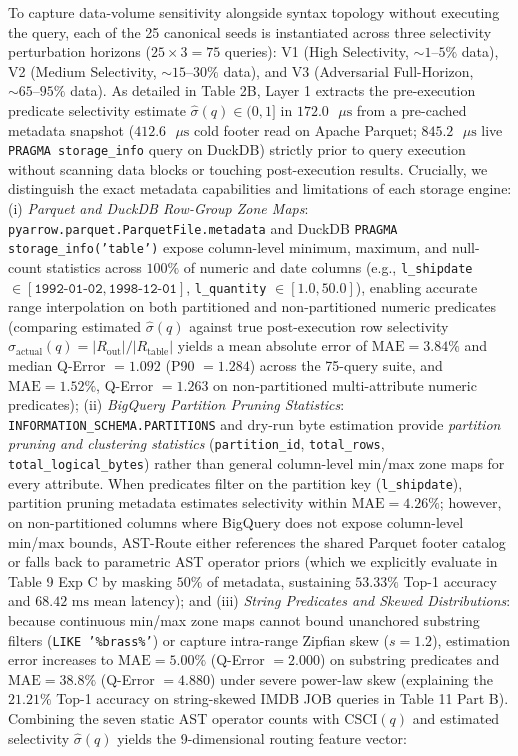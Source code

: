 \documentclass[10pt,a4paper]{article}
\begin{document}
To capture data-volume sensitivity alongside syntax topology without executing the query, each of the 25 canonical seeds is instantiated across three selectivity perturbation horizons ($25 \times 3 = 75$ queries): V1 (High Selectivity, $\sim 1\text{--}5\%$ data), V2 (Medium Selectivity, $\sim 15\text{--}30\%$ data), and V3 (Adversarial Full-Horizon, $\sim 65\text{--}95\%$ data). As detailed in Table 2B, Layer 1 extracts the pre-execution predicate selectivity estimate $\hat{\sigma}(q) \in (0, 1]$ in $172.0\text{ }\mu\text{s}$ from a pre-cached metadata snapshot ($412.6\text{ }\mu\text{s}$ cold footer read on Apache Parquet; $845.2\text{ }\mu\text{s}$ live \texttt{PRAGMA storage\_info} query on DuckDB) strictly prior to query execution without scanning data blocks or touching post-execution results. Crucially, we distinguish the exact metadata capabilities and limitations of each storage engine: (i) \emph{Parquet and DuckDB Row-Group Zone Maps}: \texttt{pyarrow.parquet.ParquetFile.metadata} and DuckDB \texttt{PRAGMA storage\_info('table')} expose column-level minimum, maximum, and null-count statistics across $100\%$ of numeric and date columns (e.g., \texttt{l\_shipdate} $\in [\texttt{1992-01-02}, \texttt{1998-12-01}]$, \texttt{l\_quantity} $\in [1.0, 50.0]$), enabling accurate range interpolation on both partitioned and non-partitioned numeric predicates (comparing estimated $\hat{\sigma}(q)$ against true post-execution row selectivity $\sigma_{\text{actual}}(q) = |R_{\text{out}}|/|R_{\text{table}}|$ yields a mean absolute error of $\text{MAE}=3.84\%$ and median Q-Error $=1.092$ (P90 $= 1.284$) across the 75-query suite, and $\text{MAE}=1.52\%$, Q-Error $=1.263$ on non-partitioned multi-attribute numeric predicates); (ii) \emph{BigQuery Partition Pruning Statistics}: \texttt{INFORMATION\_SCHEMA.}\newline\texttt{PARTITIONS} and dry-run byte estimation provide \emph{partition pruning and clustering statistics} (\texttt{partition\_id}, \texttt{total\_rows}, \texttt{total\_logical\_bytes}) rather than general column-level min/max zone maps for every attribute. When predicates filter on the partition key (\texttt{l\_shipdate}), partition pruning metadata estimates selectivity within $\text{MAE}=4.26\%$; however, on non-partitioned columns where BigQuery does not expose column-level min/max bounds, AST-Route either references the shared Parquet footer catalog or falls back to parametric AST operator priors (which we explicitly evaluate in Table 9 Exp C by masking $50\%$ of metadata, sustaining $53.33\%$ Top-1 accuracy and $68.42\text{ ms}$ mean latency); and (iii) \emph{String Predicates and Skewed Distributions}: because continuous min/max zone maps cannot bound unanchored substring filters (\texttt{LIKE '\%brass\%'}) or capture intra-range Zipfian skew ($s=1.2$), estimation error increases to $\text{MAE}=5.00\%$ (Q-Error $=2.000$) on substring predicates and $\text{MAE}=38.8\%$ (Q-Error $=4.880$) under severe power-law skew (explaining the $21.21\%$ Top-1 accuracy on string-skewed IMDB JOB queries in Table 11 Part B). Combining the seven static AST operator counts with $\text{CSCI}(q)$ and estimated selectivity $\hat{\sigma}(q)$ yields the 9-dimensional routing feature vector:
\end{document}
